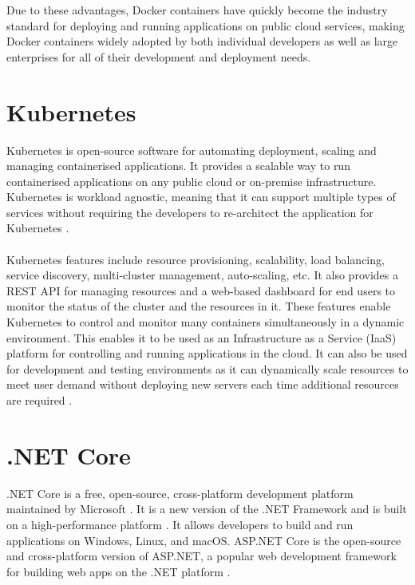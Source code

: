 \documentclass[BIF,Bachelor,nenglish]{twbook}%
\begin{document}
\noindent
Due to these advantages, Docker containers have quickly become the industry standard for deploying and running applications on public cloud services, making Docker containers widely adopted by both individual developers as well as large enterprises for all of their development and deployment needs.

\section{Kubernetes}
Kubernetes is open-source software for automating deployment, scaling and managing containerised applications. It provides a scalable way to run containerised applications on any public cloud or on-premise infrastructure. Kubernetes is workload agnostic, meaning that it can support multiple types of services without requiring the developers to re-architect the application for Kubernetes \cite{luk2018}.
\\
\\
Kubernetes features include resource provisioning, scalability, load balancing, service discovery, multi-cluster management, auto-scaling, etc. It also provides a REST API for managing resources and a web-based dashboard for end users to monitor the status of the cluster and the resources in it. These features enable Kubernetes to control and monitor many containers simultaneously in a dynamic environment. This enables it to be used as an Infrastructure as a Service (IaaS) platform for controlling and running applications in the cloud. It can also be used for development and testing environments as it can dynamically scale resources to meet user demand without deploying new servers each time additional resources are required \cite{kubernetes}.

\section{.NET Core}
.NET Core is a free, open-source, cross-platform development platform maintained by Microsoft \cite{dotnetintro}. It is a new version of the .NET Framework and is built on a high-performance platform \cite{dotnetintro}. It allows developers to build and run applications on Windows, Linux, and macOS. ASP.NET Core is the open-source and cross-platform version of ASP.NET, a popular web development framework for building web apps on the .NET platform \cite{dotnetaspcore}.
\end{document}
